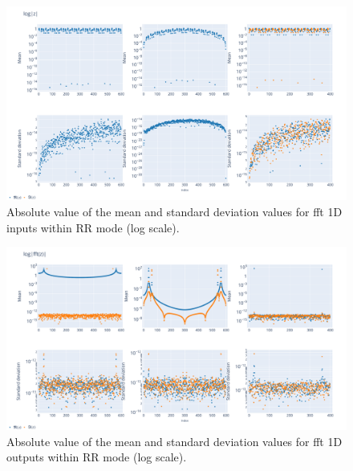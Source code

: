 \documentclass[11pt]{article}
\begin{document}
\begin{figure}
    \centering
    \includegraphics[width=\linewidth]{figure/FFT/fft_x.pdf}
    \caption{Absolute value of the mean and standard deviation values for 
    fft 1D inputs within RR mode (log scale).}
    \label{fig:fft1D_mean}
\end{figure}

\begin{figure}
    \centering
    \includegraphics[width=\linewidth]{figure/FFT/fft_y.pdf}
    \caption{Absolute value of the mean and standard deviation values 
    for fft 1D outputs within RR mode (log scale).}
    \label{fig:fft1D_std}
\end{figure}

\end{document}
